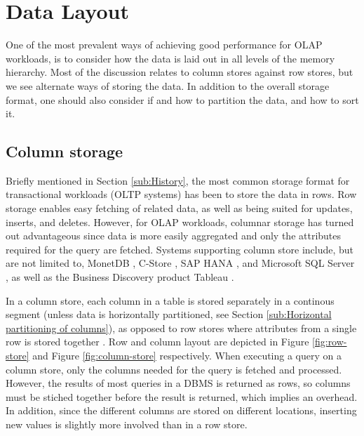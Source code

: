 \chapter{Data Layout}
\label{chap:Data Layout}
One of the most prevalent ways of achieving good performance for OLAP workloads, is to consider how the data is laid out in all levels of the memory hierarchy. Most of the discussion relates to column stores against row stores, but we see alternate ways of storing the data. In addition to the overall storage format, one should also consider if and how to partition the data, and how to sort it.
\newpage

\section{Column storage}
\label{sec:Column storage}
Briefly mentioned in Section \ref{sub:History}, the most common storage format for transactional workloads (OLTP systems) has been to store the data in rows. Row storage enables easy fetching of related data, as well as being suited for updates, inserts, and deletes. However, for OLAP workloads, columnar storage has turned out advantageous since data is more easily aggregated and only the attributes required for the query are fetched. Systems supporting column store include, but are not limited to, MonetDB \cite{Boncz2002-yj, Boncz2005-wj}, C-Store \cite{Stonebraker2005-qz}, SAP HANA \cite{Farber2012-vh}, and Microsoft SQL Server \cite{Larson2013-mc, noauthor_undated-vq}, as well as the Business Discovery product Tableau \cite{Kamkolkar2015-iq}. 

In a column store, each column in a table is stored separately in a continous segment (unless data is horizontally partitioned, see Section \ref{sub:Horizontal partitioning of columns}), as opposed to row stores where attributes from a single row is stored together \cite{Bjorklund2011-wh}. Row and column layout are depicted in Figure \ref{fig:row-store} and Figure \ref{fig:column-store} respectively. When executing a query on a column store, only the columns needed for the query is fetched and processed. However, the results of most queries in a DBMS is returned as rows, so columns must be stiched together before the result is returned, which implies an overhead. In addition, since the different columns are stored on different locations, inserting new values is slightly more involved than in a row store. 

